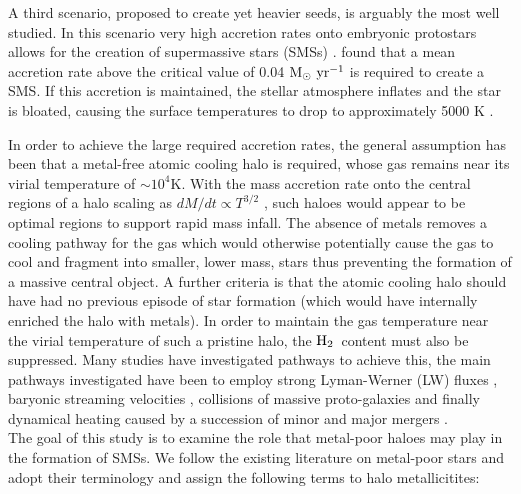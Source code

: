 \documentclass[graphics, twocolumn, usenatbib]{mn2e}
\newcommand{\msolaryr} {$\rm{M_{\odot}~yr^{-1}}~$}
\newcommand{\molH} {$\rm{H_2}$~}
\begin{document}
\indent A third scenario, proposed to create yet heavier seeds, is arguably the most well studied. In this scenario very high accretion rates onto embryonic protostars allows for the creation of supermassive stars (SMSs)
\citep{Shapiro_1979, Begelman_2008, Schleicher_2013, Hosokawa_2013, Inayoshi_2014, Sakurai_2016,
  Umeda_2016, Haemmerle_2017,Woods_2017, Woods_2018, Regan_2018b}. \cite{Sakurai_2016} found
that a mean accretion rate above the critical value of 0.04 \msolaryr is required to create a SMS.
If this accretion is maintained, the stellar atmosphere inflates and the star is bloated, causing the surface temperatures to drop to approximately 5000 K \citep{Hosokawa_2013, Woods_2017, Haemmerle_2017}. 

In order to achieve the large required accretion rates, the general assumption has been
that a metal-free atomic cooling halo is required, whose gas remains near its virial temperature of $\sim10^4$K.
With the mass accretion rate onto the central regions of a halo scaling as $dM/dt \propto T^{3/2}$ \citep{Shu_1977}, such haloes would appear
to be optimal regions to support rapid mass infall. The absence of metals removes a cooling pathway for
the gas which would otherwise potentially cause the gas to cool and fragment into smaller, lower
mass, stars thus preventing the formation of a massive central object. A further criteria is that the
atomic cooling halo should have had no previous episode of star formation (which would have
internally enriched the halo with metals). In order to maintain the gas temperature near the virial temperature of such a pristine halo, the \molH content
must also be suppressed. Many studies have investigated pathways to achieve this, the main pathways
investigated have been to employ strong Lyman-Werner (LW) fluxes \citep{Dijkstra_2008, Shang_2010,
  Regan_2014b, Latif_2014b, Agarwal_2015a, Latif_2015, Regan_2016a, Regan_2017, Regan_2018a},
baryonic streaming velocities
\citep{Tseliakhovich_2010, Tanaka_2014, Hirano_2017, Schauer_2017}, collisions of massive
proto-galaxies \citep{Mayer_2010, Mayer_2014, Inayoshi_2015} and finally dynamical heating caused
by a succession of minor and major mergers \citep{Yoshida_2003a, Fernandez_2014, Wise_2019}. \\
\indent The goal of this study is to examine the role that metal-poor haloes may play in the
formation of SMSs. We follow the existing literature on metal-poor stars \citep[e.g.][]{Frebel_2015}
and adopt their terminology and assign the following terms to halo metallicitites:
\end{document}

